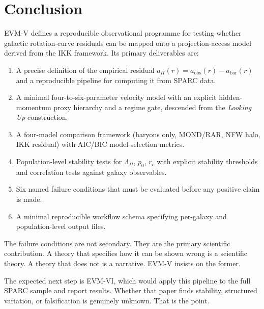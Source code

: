 \documentclass[11pt,a4paper,oneside]{article}
\newcommand{\aobs}{a_{\mathrm{obs}}}
\newcommand{\abar}{a_{\mathrm{bar}}}
\newcommand{\aPi}{a_{\Pi}}
\newcommand{\LamPi}{\Lambda_{\Pi}}
\newcommand{\pzero}{p_0}
\newcommand{\rc}{r_c}
\begin{document}
\section{Conclusion}

EVM-V defines a reproducible observational programme for testing whether galactic
rotation-curve residuals can be mapped onto a projection-access model derived from the
IKK framework. Its primary deliverables are:

\begin{enumerate}
  \item A precise definition of the empirical residual
        $\aPi(r) = \aobs(r) - \abar(r)$ and a reproducible pipeline for computing
        it from SPARC data.
  \item A minimal four-to-six-parameter velocity model with an explicit
        hidden-momentum proxy hierarchy and a regime gate, descended from the
        \emph{Looking Up} construction.
  \item A four-model comparison framework (baryons only, MOND/RAR, NFW halo, IKK
        residual) with AIC/BIC model-selection metrics.
  \item Population-level stability tests for $\LamPi$, $\pzero$, $\rc$ with explicit
        stability thresholds and correlation tests against galaxy observables.
  \item Six named failure conditions that must be evaluated before any positive claim
        is made.
  \item A minimal reproducible workflow schema specifying per-galaxy and
        population-level output files.
\end{enumerate}

The failure conditions are not secondary. They are the primary scientific contribution.
A theory that specifies how it can be shown wrong is a scientific theory. A theory that
does not is a narrative. EVM-V insists on the former.

The expected next step is EVM-VI, which would apply this pipeline to the full SPARC
sample and report results. Whether that paper finds stability, structured variation, or
falsification is genuinely unknown. That is the point.

\end{document}
